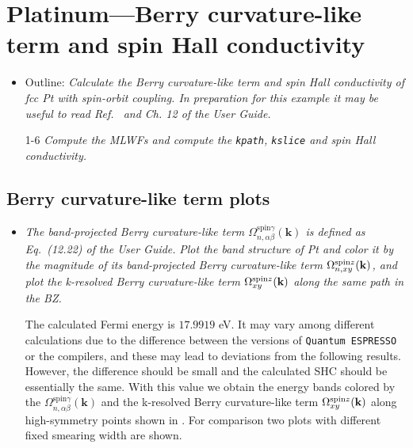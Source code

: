 \section{Platinum---Berry curvature-like term and spin Hall conductivity}
\label{sec29:PtSHC}

\begin{itemize}
	\item Outline: {\it Calculate the Berry curvature-like term and spin Hall conductivity
	of fcc Pt with spin-orbit coupling. In preparation for this example it may be useful to read Ref.~ and Ch. 12 of the User Guide.}
\end{itemize}

\begin{itemize}
	\item[1-6] {\it Compute the MLWFs and compute the {\tt kpath}, {\tt kslice} and spin Hall conductivity.} 
\end{itemize}

\subsection*{Berry curvature-like term plots}
\begin{itemize}
	\item {\it The band-projected Berry curvature-like term $\Omega_{n,\alpha\beta}^{\text{spin} \gamma}({\bm k})$ 
		is defined as Eq.~(12.22) of the User Guide.}
	{\it Plot the band structure of Pt and color it 
		by the magnitude of its band-projected Berry curvature-like term $\Omega_{n,xy}^{\text{spin}z}(\bf k)$, 
		and plot the k-resolved Berry curvature-like term $\Omega_{xy}^{\text{spin}z}(\bf k)$ along the 
		same path in the BZ. }

	The calculated Fermi energy is $17.9919$ eV. It may vary among different calculations due to the difference between the versions of {\tt Quantum ESPRESSO} or the compilers, and these may lead to deviations from the following results. However, the difference should be small and the calculated SHC should be essentially the same. With this value we obtain the energy bands colored by the 
	$\Omega_{n,\alpha\beta}^{\text{spin} \gamma}({\bm k})$ and the k-resolved Berry curvature-like term $\Omega_{xy}^{\text{spin}z}(\bf k)$ along high-symmetry points shown in . 
	For comparison two plots with different fixed smearing width are shown.
\end{itemize}

